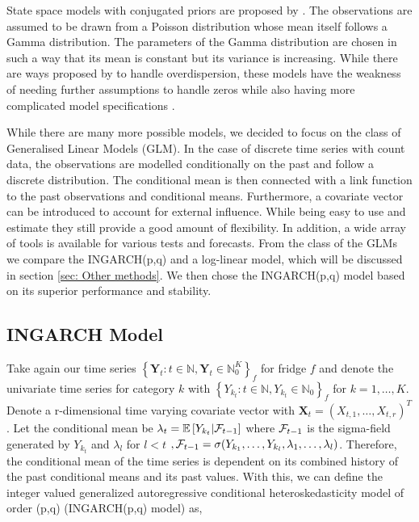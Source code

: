 State space models with conjugated priors are proposed by \cite{Harvey:1989}. The observations are assumed to be drawn from a Poisson distribution whose mean itself follows a Gamma distribution. The parameters of the Gamma distribution are chosen in such a way that its mean is constant but its variance is increasing. While there are ways proposed by \cite{Qaqish:1988} to handle overdispersion, these models have the weakness of needing further assumptions to handle zeros while also having more complicated model specifications \cite{Heinen:2003}.

While there are many more possible models, we decided to focus on the class of Generalised Linear Models (GLM). In the case of discrete time series with count data, the observations are modelled conditionally on the past and follow a discrete distribution. The conditional mean is then connected with a link function to the past observations and conditional means. Furthermore, a covariate vector can be introduced to account for external influence. While being easy to use and estimate they still provide a good amount of flexibility. In addition, a wide array of tools is available for various tests and forecasts. From the class of the GLMs we compare the INGARCH(p,q) and a log-linear model, which will be discussed in section \ref{sec: Other methods}. We then chose the INGARCH(p,q) model based on its superior performance and stability.


\subsection{INGARCH Model}
\label{sec:Ingarch Model}
Take again our time series $\left\{\bm{Y}_t:t\in \mathbb{N}, \bm{Y}_t \in \mathbb{N}_0^K \right\}_f$ for fridge $f$ and denote the univariate time series for category $k$ with $\left\{Y_{k_t}:t\in \mathbb{N}, Y_{k_t} \in \mathbb{N}_0\right\}_f$  for $k=1,\ldots,K$. Denote a r-dimensional time varying covariate vector with $\textbf{X}_t=(X_{t,1},\ldots,X_{t,r})^T$. Let the conditional mean be $\lambda_t = \mathbb{E}\left[Y_{k_t} | \mathcal{F}_{t-1} \right]$ where $\mathcal{F}_{t-1}$ is the sigma-field generated by $Y_{k_t}$ and $\lambda_l$ for $l<t$ $, \mathcal{F} _{t-1}= \sigma(Y_{k_1},\ldots,Y_{k_l},\lambda_1, \ldots, \lambda_l)$. Therefore, the conditional mean of the time series is dependent on its combined history of the past conditional means and its past values. With this, we can define the integer valued generalized autoregressive conditional heteroskedasticity model of order (p,q) (INGARCH(p,q) model) as,

